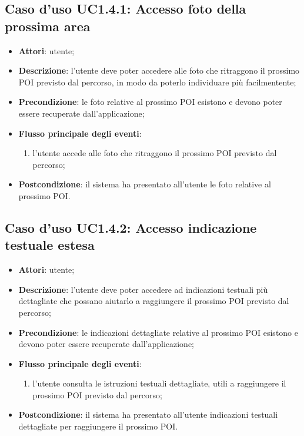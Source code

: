 \documentclass[../AnalisiDeiRequisiti.tex]{subfiles}
\begin{document}
\subsection{Caso d'uso UC1.4.1: Accesso foto della prossima area}
\begin{itemize}
\item \textbf{Attori}: utente;
\item \textbf{Descrizione}: l'utente deve poter accedere alle foto che ritraggono il prossimo POI previsto dal percorso, in modo da poterlo individuare più facilmentente; 
      \item \textbf{Precondizione}: le foto relative al prossimo POI esistono e devono poter essere recuperate dall'applicazione;

        \item \textbf{Flusso principale degli eventi}:
          \begin{enumerate}
          \item l'utente accede alle foto che ritraggono il prossimo POI previsto dal percorso;

      \end{enumerate}
    \item \textbf{Postcondizione}: il sistema ha presentato all'utente le foto relative al prossimo POI.
  \end{itemize}
\hypertarget{UC1.4.2}{}
\subsection{Caso d'uso UC1.4.2: Accesso indicazione testuale estesa}
\begin{itemize}
\item \textbf{Attori}: utente;
\item \textbf{Descrizione}: l'utente deve poter accedere ad indicazioni testuali più dettagliate che possano aiutarlo a raggiungere il prossimo POI previsto dal percorso; 
      \item \textbf{Precondizione}: le indicazioni dettagliate relative al prossimo POI esistono e devono poter essere recuperate dall'applicazione;

        \item \textbf{Flusso principale degli eventi}:
          \begin{enumerate}
          \item l'utente consulta le istruzioni testuali dettagliate, utili a raggiungere il prossimo POI previsto dal percorso;

      \end{enumerate}
    \item \textbf{Postcondizione}: il sistema ha presentato all'utente indicazioni testuali dettagliate per raggiungere il prossimo POI.
  \end{itemize}
\hypertarget{UC1.4.3}{}
\end{document}
